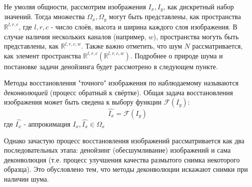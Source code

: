 \par Не умоляя общности, рассмотрим изображения $I_x, I_y$, как дискретный набор значений. Тогда множества $\Omega_x, \Omega_y$ могут быть представлены, как пространства $\mathbb{R}^{l,r,c}$, где $l, r, c$ - число слоёв, высота и ширина каждого слоя изображения. В случае наличия нескольких каналов (например, $w$), пространства могуть быть представлены, как $\mathbb{R}^{l,r,c,w}$. Также важно отметить, что шум $N$ рассматривается, как элемент пространства $\mathbb{R}^{l,r,c} (\mathbb{R}^{l,r,c,w})$. Подробнее о природе шума и постановке задачи денойзинга будет рассмотрено в следующем пункте.
\par Методы восстановления "точного" изображения по наблюдаемому называются \textit{деконволюцией} (процесс обратный к свёртке). Общая задача восстановления изображения может быть сведена к выбору функции $\mathscr{F}(I_y)$:
\begin{equation}
	\hat{I_x} = \mathscr{F}(I_y)
\end{equation}
где $\hat{I_x}$ - аппрокимация $I_x, \hat{I_x} \in \Omega_x$
\par Однако зачастую процесс восстановления изображений рассматривается как два последовательных этапа: денойзинг (обесшумливание) изображений и сама деконволюция (т.е. процесс улучшения качества размытого снимка некоторого образца). Это обусловлено тем, что методы деконволюции искажают снимки при наличии шума.

